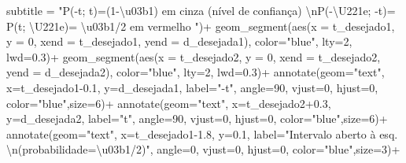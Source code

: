 \documentclass[
]{book}
\newenvironment{Shaded}{\begin{snugshade}}{\end{snugshade}}
\newcommand{\AttributeTok}[1]{\textcolor[rgb]{0.77,0.63,0.00}{#1}}
\newcommand{\DecValTok}[1]{\textcolor[rgb]{0.00,0.00,0.81}{#1}}
\newcommand{\FloatTok}[1]{\textcolor[rgb]{0.00,0.00,0.81}{#1}}
\newcommand{\FunctionTok}[1]{\textcolor[rgb]{0.00,0.00,0.00}{#1}}
\newcommand{\NormalTok}[1]{#1}
\newcommand{\SpecialCharTok}[1]{\textcolor[rgb]{0.00,0.00,0.00}{#1}}
\newcommand{\StringTok}[1]{\textcolor[rgb]{0.31,0.60,0.02}{#1}}
\begin{document}
\begin{Shaded}
\begin{Highlighting}[]
       \AttributeTok{subtitle =} \StringTok{"P({-}t; t)=(1{-}\textbackslash{}u03b1) em cinza (nível de confiança) }\SpecialCharTok{\textbackslash{}n}\StringTok{P({-}\textbackslash{}U221e; {-}t)= P(t; \textbackslash{}U221e)= \textbackslash{}u03b1/2 em vermelho "}\NormalTok{)}\SpecialCharTok{+}
  \FunctionTok{geom\_segment}\NormalTok{(}\FunctionTok{aes}\NormalTok{(}\AttributeTok{x =}\NormalTok{ t\_desejado1, }\AttributeTok{y =} \DecValTok{0}\NormalTok{, }\AttributeTok{xend =}\NormalTok{ t\_desejado1, }\AttributeTok{yend =}\NormalTok{ d\_desejada1), }\AttributeTok{color=}\StringTok{"blue"}\NormalTok{, }\AttributeTok{lty=}\DecValTok{2}\NormalTok{, }\AttributeTok{lwd=}\FloatTok{0.3}\NormalTok{)}\SpecialCharTok{+}
  \FunctionTok{geom\_segment}\NormalTok{(}\FunctionTok{aes}\NormalTok{(}\AttributeTok{x =}\NormalTok{ t\_desejado2, }\AttributeTok{y =} \DecValTok{0}\NormalTok{, }\AttributeTok{xend =}\NormalTok{ t\_desejado2, }\AttributeTok{yend =}\NormalTok{ d\_desejada2), }\AttributeTok{color=}\StringTok{"blue"}\NormalTok{, }\AttributeTok{lty=}\DecValTok{2}\NormalTok{, }\AttributeTok{lwd=}\FloatTok{0.3}\NormalTok{)}\SpecialCharTok{+}
  \FunctionTok{annotate}\NormalTok{(}\AttributeTok{geom=}\StringTok{"text"}\NormalTok{, }\AttributeTok{x=}\NormalTok{t\_desejado1}\FloatTok{{-}0.1}\NormalTok{, }\AttributeTok{y=}\NormalTok{d\_desejada1, }\AttributeTok{label=}\StringTok{"{-}t"}\NormalTok{, }\AttributeTok{angle=}\DecValTok{90}\NormalTok{, }\AttributeTok{vjust=}\DecValTok{0}\NormalTok{, }\AttributeTok{hjust=}\DecValTok{0}\NormalTok{, }\AttributeTok{color=}\StringTok{"blue"}\NormalTok{,}\AttributeTok{size=}\DecValTok{6}\NormalTok{)}\SpecialCharTok{+}
  \FunctionTok{annotate}\NormalTok{(}\AttributeTok{geom=}\StringTok{"text"}\NormalTok{, }\AttributeTok{x=}\NormalTok{t\_desejado2}\FloatTok{+0.3}\NormalTok{, }\AttributeTok{y=}\NormalTok{d\_desejada2, }\AttributeTok{label=}\StringTok{"t"}\NormalTok{, }\AttributeTok{angle=}\DecValTok{90}\NormalTok{, }\AttributeTok{vjust=}\DecValTok{0}\NormalTok{, }\AttributeTok{hjust=}\DecValTok{0}\NormalTok{, }\AttributeTok{color=}\StringTok{"blue"}\NormalTok{,}\AttributeTok{size=}\DecValTok{6}\NormalTok{)}\SpecialCharTok{+}
  \FunctionTok{annotate}\NormalTok{(}\AttributeTok{geom=}\StringTok{"text"}\NormalTok{, }\AttributeTok{x=}\NormalTok{t\_desejado1}\FloatTok{{-}1.8}\NormalTok{, }\AttributeTok{y=}\FloatTok{0.1}\NormalTok{, }\AttributeTok{label=}\StringTok{"Intervalo aberto à esq. }\SpecialCharTok{\textbackslash{}n}\StringTok{(probabilidade=\textbackslash{}u03b1/2)"}\NormalTok{, }\AttributeTok{angle=}\DecValTok{0}\NormalTok{, }\AttributeTok{vjust=}\DecValTok{0}\NormalTok{, }\AttributeTok{hjust=}\DecValTok{0}\NormalTok{, }\AttributeTok{color=}\StringTok{"blue"}\NormalTok{,}\AttributeTok{size=}\DecValTok{3}\NormalTok{)}\SpecialCharTok{+}

\end{Highlighting}
\end{Shaded}
\end{document}
